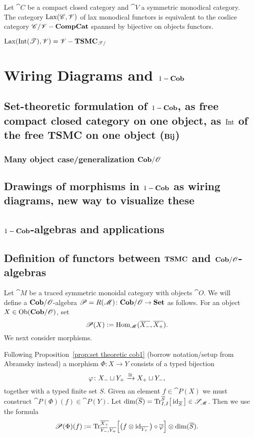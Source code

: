 \begin{theorem}
 Let $\cat{C}$ be a compact closed category and $\cat{V}$ a symmetric monodical category.  The category $\operatorname{Lax}(\mathscr{C},\mathscr{V})$ of lax monodical functors is equivalent to the coslice category $\mathscr{C}/\mathscr{V}-\mathbf{CompCat}$ spanned by bijective on objects functors.
\end{theorem}
\begin{corollary}
 $\operatorname{Lax}(\operatorname{Int}(\mathscr{T}),\mathscr{V})=\mathscr{V}-\mathbf{TSMC}_{\mathscr{T}/}$
\end{corollary}

\chapter{Wiring Diagrams and $1-\mathbf{Cob}$}
\section{Set-theoretic formulation of $1-\mathbf{Cob}$, as free compact closed category on one object, as $\operatorname{Int}$ of the free TSMC on one object ($\mathbf{Bij}$)}
\subsection{Many object case/generalization $\mathbf{Cob}/\mathscr{O}$}

\section{Drawings of morphisms in $1-\mathbf{Cob}$ as wiring diagrams, new way to visualize these}

\section{$1-\mathbf{Cob}$-algebras and applications}

\section{Definition of functors between $\mathbf{TSMC}$ and $\mathbf{Cob}/\mathscr{O}$-algebras}

Let $\cat{M}$ be a traced symmetric monoidal category with objects $\cat{O}$. We will define a $\mathbf{Cob}/\mathscr{O}$-algebra $\mathscr{P}=R(\mathscr{M})\colon\mathbf{Cob}/\mathscr{O}\to\mathbf{Set}$ as follows. For an object $X\in\operatorname{Ob}(\mathbf{Cob}/\mathscr{O})$, set 
$$\mathscr{P}(X):=\operatorname{Hom}_{\mathscr{M}}(\overline{{X_-}},\overline{{X_+}}).$$
We next consider morphisms.

Following Proposition~\ref{prop:set theoretic cob1} (borrow notation/setup from Abramsky instead) a morphism $\Phi\colon X\longrightarrow Y$ consists of a typed bijection 
$$\varphi\colon{X_-}\sqcup {Y_+}\xrightarrow{\cong}{X_+}\sqcup {Y_-},$$ 
together with a typed finite set $S$. Given an element $f\in\cat{P}(X)$ we must construct $\cat{P}(\Phi)(f)\in\cat{P}(Y)$. Let $\dim(\overline{S})=\textnormal{Tr}^{\overline{S}}_{I,I}\big[\operatorname{id}_{\overline{S}}\big]\in\mathscr{S}_{\mathscr{M}}$. Then we use the formula
$$\mathscr{P}(\Phi)(f):=
\textnormal{Tr}^{\overline{X_+}}_{\overline{Y_-},\overline{Y_+}}\Big[\big(f\otimes\operatorname{id}_{\overline{Y_+}}\big)\circ\overline{\varphi}\Big]
\otimes\dim(\overline{S}).	
$$

